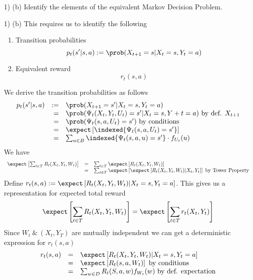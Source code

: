 \documentclass[11pt,a4paper]{article}
\begin{document}
\begin{question}{1) (b)}
  Identify the elements of the equivalent Markov Decision Problem.
\end{question}

\begin{answer}{1) (b)}
  This requires us to identify the following
  \begin{enumerate}
    \item Transition probabilities
    \[ p_t(s'|s,a):=\prob(X_{t+1}=s|X_t=s,Y_t=a) \]
    \item Equivalent reward
    \[ r_t(s,a) \]
  \end{enumerate}
  We derive the transition probabilities as follows
  \[\begin{array}{rrl}
    p_t(s'|s,a)&:=&\prob(X_{t+1}=s'|X_t=s,Y_t=a)\\
    &=&\prob(\Psi_t(X_t,Y_t,U_t)=s'|X_t=s,Y+t=a)\text{ by def. }X_{t+1}\\
    &=&\prob(\Psi_t(s,a,U_t)=s')\text{ by conditions }\\
    &=&\expect\left[\indexed\{\Psi_t(s,a,U_t)=s'\}\right]\\
    &=&\sum_{u\in B}\indexed\{\Psi_t(s,a,u)=s'\}\cdot f_{U_t}(u)
  \end{array}\]
  We have
  \[\begin{array}{rcl}
    \expect\left[\sum_{t\in T}R_t(X_t,Y_t,W_t)\right]&=&\sum_{t\in T}\expect\left[R_t(X_t,Y_t,W_t)\right]\\
    &=&\sum_{t\in T}\expect\left[\expect\left[R_t(X_t,Y_t,W_t)|X_t,Y_t\right]\right]\text{ by Tower Property}
  \end{array}\]
  Define $r_t(s,a):=\expect\left[R_t(X_t,Y_t,W_t)|X_t=s,Y_t=a\right]$. This gives us a representation for expected total reward
  \[ \expect\left[\sum_{t\in T}R_t(X_t,Y_t,W_t)\right]=\expect\left[\sum_{t\in T}r_t(X_t,Y_t)\right] \]
  Since $W_t\ \&\ (X_t,Y_T)$ are mutually independent we can get a deterministic expression for $r_t(s,a)$
  \[\begin{array}{rcl}
    r_t(s,a)&=&\expect\left[R_t(X_t,Y_t,W_t)|X_t=s,Y_t=a\right]\\
    &=&\expect\left[R_t(s,a,W_t)\right]\text{ by conditions}\\
    &=&\sum_{w\in D}R_t(S,a,w)f_{W_t}(w)\text{ by def. expectation}
  \end{array}\]
\end{answer}
\end{document}
